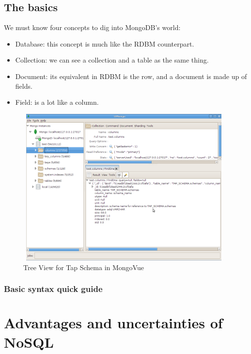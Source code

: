 \subsection{The basics}

We must know four concepts to dig into MongoDB's world:

\begin{itemize}
\item Database: this concept is much like the RDBM counterpart.
\item Collection: we can see a collection and a table as the same thing.
\item Document: its equivalent in RDBM is the row, and a document is made up of fields.
\item Field: is a lot like a column.
\end{itemize}


\begin{figure}[H]
\centering
\includegraphics[width=11cm,height=8cm]{images/mongo_dia.png}
\caption{Tree View for Tap Schema in MongoVue}
\end{figure}


\subsubsection{Basic syntax quick guide}



\section{Advantages and uncertainties of NoSQL}


